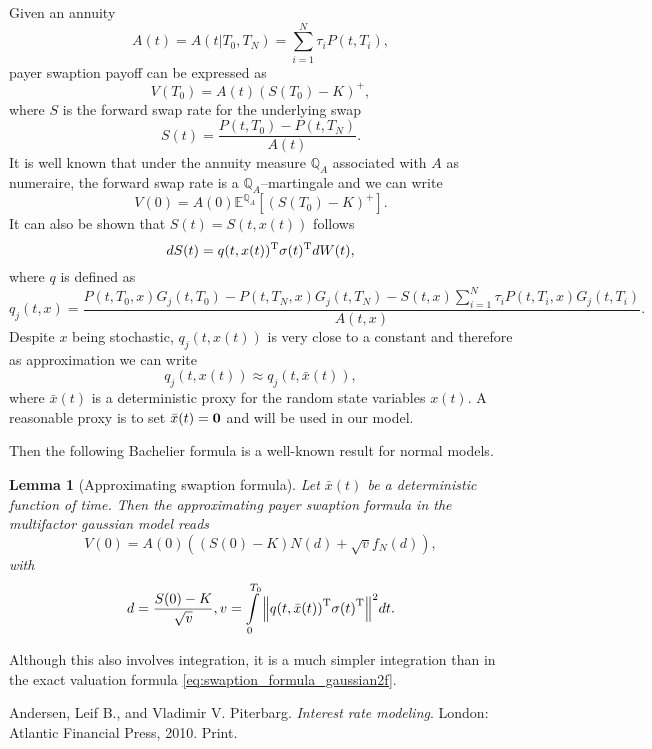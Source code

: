 \documentclass[11pt,a4paper]{article}
\theoremstyle{break} %
\newtheorem{lemma}{Lemma}[section]
\numberwithin{equation}{section}
\begin{document}
\noindent Given an annuity 
\begin{equation*}
A(t) = A(t|{T_0},{T_N}) = \sum\limits_{i = 1}^N {{\tau _i}P(t,{T_i})},
\end{equation*}
payer swaption payoff can be expressed as
\begin{equation*}
V({T_0}) = A(t){\left( {S({T_0}) - K} \right)^ + },
\end{equation*}
where $S$ is the forward swap rate for the underlying swap
\begin{equation*}
S(t) = \frac{{P(t,{T_0}) - P(t,{T_N})}}{{A(t)}}.
\end{equation*}
It is well known that under the annuity measure ${\mathbb{Q}_A}$ associated with $A$ as numeraire, the forward swap rate is a ${\mathbb{Q}_A}$--martingale and we can write
\begin{equation*}
V(0) = A(0){\mathbb{E}^{{\mathbb{Q}_A}}}\left[ {{{\left( {S({T_0}) - K} \right)}^ + }} \right].
\end{equation*}
It can also be shown that $S(t)=S(t,x(t))$ follows
\begin{equation*}
dS(t) = q{(t,x(t))^{\rm{T}}}\sigma {(t)^{\rm{T}}}dW(t),
\end{equation*}
where $q$ is defined as
\begin{equation*}
{q_j}(t,x) = \frac{{P(t,{T_0},x){G_j}(t,{T_0}) - P(t,{T_N},x){G_j}(t,{T_N}) - S(t,x)\sum\limits_{i = 1}^N {{\tau _i}P(t,{T_i},x){G_j}(t,{T_i})} }}{{A(t,x)}}.
\end{equation*}
Despite $x$ being stochastic, ${q_j}(t,x(t))$ is very close to a constant and therefore as approximation we can write
\begin{equation*}
{q_j}(t,x(t)) \approx {q_j}(t,\bar x(t)),
\end{equation*}
where $\bar x(t)$ is a deterministic proxy for the random state variables $x(t)$. A reasonable proxy is to set $\bar x(t) = {\bf{0}}$ and will be used in our model.

Then the following Bachelier formula is a well-known result for normal models.
\begin{lemma}[Approximating swaption formula]
	Let $\bar x(t)$ be a deterministic function of time. Then the approximating payer swaption formula in the multifactor gaussian model reads
	\begin{equation*}
	V(0) = A(0)\left( {(S(0) - K)N(d) + \sqrt v {f_N}(d)} \right),
	\end{equation*}
	with 
	\begin{equation*}
	d = \frac{{S(0) - K}}{{\sqrt v }},v = \int\limits_0^{{T_0}} {{{\left\| {q{{(t,\bar x(t))}^{\rm{T}}}\sigma {{(t)}^{\rm{T}}}} \right\|}^2}} dt.
	\end{equation*}
\end{lemma}
Although this also involves integration, it is a much simpler integration than in the exact valuation formula \eqref{eq:swaption_formula_gaussian2f}.

\newpage


\begin{thebibliography}{9}
	Andersen, Leif B., and Vladimir V. Piterbarg. 
	\textit{Interest rate modeling}. 
	London: Atlantic Financial Press, 2010. Print.
\end{thebibliography}
\end{document}
